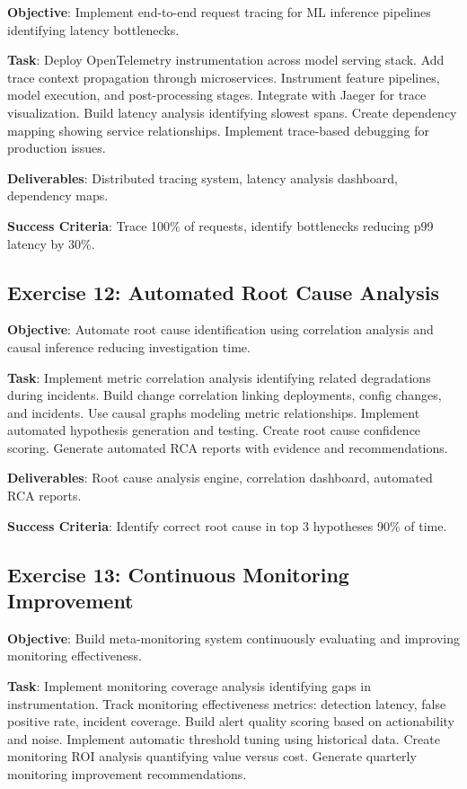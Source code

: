 \textbf{Objective}: Implement end-to-end request tracing for ML inference pipelines identifying latency bottlenecks.

\textbf{Task}: Deploy OpenTelemetry instrumentation across model serving stack. Add trace context propagation through microservices. Instrument feature pipelines, model execution, and post-processing stages. Integrate with Jaeger for trace visualization. Build latency analysis identifying slowest spans. Create dependency mapping showing service relationships. Implement trace-based debugging for production issues.

\textbf{Deliverables}: Distributed tracing system, latency analysis dashboard, dependency maps.

\textbf{Success Criteria}: Trace 100\% of requests, identify bottlenecks reducing p99 latency by 30\%.

\subsection{Exercise 12: Automated Root Cause Analysis}

\textbf{Objective}: Automate root cause identification using correlation analysis and causal inference reducing investigation time.

\textbf{Task}: Implement metric correlation analysis identifying related degradations during incidents. Build change correlation linking deployments, config changes, and incidents. Use causal graphs modeling metric relationships. Implement automated hypothesis generation and testing. Create root cause confidence scoring. Generate automated RCA reports with evidence and recommendations.

\textbf{Deliverables}: Root cause analysis engine, correlation dashboard, automated RCA reports.

\textbf{Success Criteria}: Identify correct root cause in top 3 hypotheses 90\% of time.

\subsection{Exercise 13: Continuous Monitoring Improvement}

\textbf{Objective}: Build meta-monitoring system continuously evaluating and improving monitoring effectiveness.

\textbf{Task}: Implement monitoring coverage analysis identifying gaps in instrumentation. Track monitoring effectiveness metrics: detection latency, false positive rate, incident coverage. Build alert quality scoring based on actionability and noise. Implement automatic threshold tuning using historical data. Create monitoring ROI analysis quantifying value versus cost. Generate quarterly monitoring improvement recommendations.

